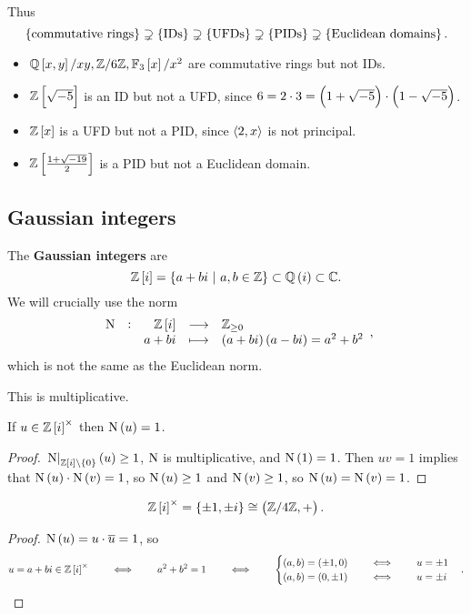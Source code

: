 Thus
$$ \cbr{\text{commutative rings}} \supsetneq \cbr{\text{IDs}} \supsetneq \cbr{\text{UFDs}} \supsetneq \cbr{\text{PIDs}} \supsetneq \cbr{\text{Euclidean domains}}. $$
\begin{itemize}
\item $ \QQ\sbr{x, y} / xy, \ZZ / 6\ZZ, \FF_3\sbr{x} / x^2 $ are commutative rings but not IDs.
\item $ \ZZ\sbr{\sqrt{-5}} $ is an ID but not a UFD, since $ 6 = 2 \cdot 3 = \br{1 + \sqrt{-5}} \cdot \br{1 - \sqrt{-5}} $.
\item $ \ZZ\sbr{x} $ is a UFD but not a PID, since $ \left\langle 2, x \right\rangle $ is not principal.
\item $ \ZZ\sbr{\tfrac{1 + \sqrt{-19}}{2}} $ is a PID but not a Euclidean domain.
\end{itemize}

\pagebreak

\subsection{Gaussian integers}

The \textbf{Gaussian integers} are
$$ \ZZ\sbr{i} = \cbr{a + bi \st a, b \in \ZZ} \subset \QQ\br{i} \subset \CC. $$
We will crucially use the norm
$$ \function[\N]{\ZZ\sbr{i}}{\ZZ_{\ge 0}}{a + bi}{\br{a + bi}\br{a - bi} = a^2 + b^2}, $$
which is not the same as the Euclidean norm.

\begin{note*}
This is multiplicative.
\end{note*}

\begin{proposition}
If $ u \in \ZZ\sbr{i}^\times $ then $ \N\br{u} = 1 $.
\end{proposition}

\begin{proof}
$ \eval{\N}_{\ZZ\sbr{i} \setminus \cbr{0}}\br{u} \ge 1 $, $ \mathrm{N} $ is multiplicative, and $ \N\br{1} = 1 $. Then $ uv = 1 $ implies that $ \N\br{u} \cdot \N\br{v} = 1 $, so $ \N\br{u} \ge 1 $ and $ \N\br{v} \ge 1 $, so $ \N\br{u} = \N\br{v} = 1 $.
\end{proof}

\begin{theorem}
$$ \ZZ\sbr{i}^\times = \cbr{\pm 1, \pm i} \cong \br{\ZZ / 4\ZZ, +}. $$
\end{theorem}

\begin{proof}
$ \N\br{u} = u \cdot \overline{u} = 1 $, so
$$ u = a + bi \in \ZZ\sbr{i}^\times \qquad \iff \qquad a^2 + b^2 = 1 \qquad \iff \qquad
\begin{cases}
\br{a, b} = \br{\pm 1, 0} \qquad \iff \qquad u = \pm 1 \\
\br{a, b} = \br{0, \pm 1} \qquad \iff \qquad u = \pm i
\end{cases}.
$$
\end{proof}

